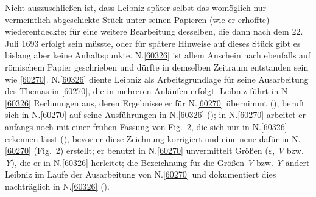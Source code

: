 Nicht auszuschließen ist, dass Leibniz später selbst das womöglich nur vermeintlich abgeschickte Stück unter seinen Papieren (wie er erhoffte) wiederentdeckte; für eine weitere Bearbeitung desselben, die dann nach dem 22. Juli 1693 erfolgt sein müsste, oder für spätere Hinweise auf dieses Stück gibt es bislang aber keine Anhaltspunkte.
\pend
\pstart
N.\;\ref{60326} ist allem Anschein nach ebenfalls auf römischem Papier geschrieben und dürfte in demselben Zeitraum entstanden sein wie \ref{60270}. N.\;\ref{60326} diente Leibniz als Arbeitsgrundlage für seine Ausarbeitung des Themas in \ref{60270}, die in mehreren Anläufen erfolgt. 
Leibniz führt in N.\;\ref{60326} Rechnungen aus, deren Ergebnisse er für N.\;\ref{60270} übernimmt (), beruft sich in N.\;\ref{60270} auf seine Ausführungen in N.\;\ref{60326} (); in N.\;\ref{60270} arbeitet er anfangs noch mit einer frühen Fassung von Fig.~2, die sich nur in N.\;\ref{60326} erkennen lässt (), bevor er diese Zeichnung korrigiert und eine neue dafür in N.\;\ref{60270} (Fig.~2) erstellt; er benutzt in N.\;\ref{60270} unvermittelt Größen ($\varepsilon$, \textit{V} bzw. \textit{Y}), die er in N.\;\ref{60326} herleitet; die Bezeichnung für die Größen \textit{V} bzw. \textit{Y} ändert Leibniz im Laufe der Ausarbeitung von N.\;\ref{60270} und dokumentiert dies nachträglich in N.\;\ref{60326} ().%
\pend
{}%
\frenchspacing%
\normalsize%






